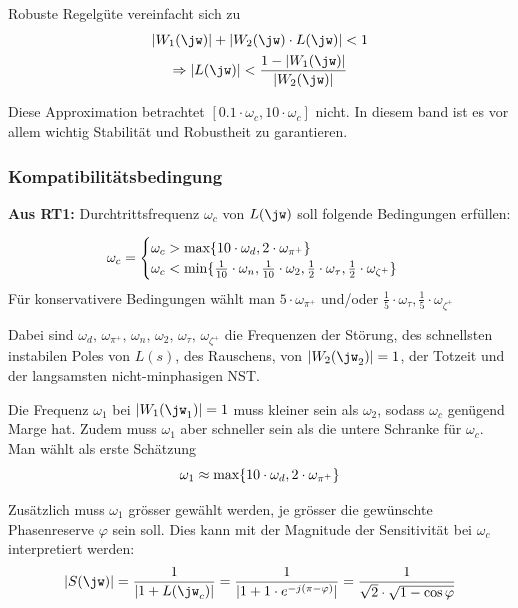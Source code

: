         Robuste Regelgüte vereinfacht sich zu
        \begin{gather*}
            |W_1(\jw)| + |W_2(\jw)\cdot L(\jw)| < 1\\
            \Rightarrow |L(\jw)| < \frac{1 - |W_1(\jw)|}{|W_2(\jw)|}
        \end{gather*}
        
        Diese Approximation betrachtet $[0.1\cdot \omega_c, 10\cdot\omega_c]$ nicht. In diesem band ist es vor allem wichtig Stabilität und Robustheit zu garantieren.
        
    \subsubsection{Kompatibilitätsbedingung}
        \textbf{Aus RT1:} Durchtrittsfrequenz $\omega_c$ von $L(\jw)$ soll folgende Bedingungen erfüllen:
        
        \begin{equation*}
            \omega_c = 
            \begin{cases}
                \omega_c > \textnormal{max}\{10\cdot\omega_d, 2\cdot\omega_{\pi^+}\}\\
                \omega_c < \textnormal{min}\{\frac{1}{10}\cdot\omega_n, \frac{1}{10}\cdot \omega_2, \frac{1}{2}\cdot \omega_\tau, \frac{1}{2}\cdot \omega_{\zeta^+}\}
            \end{cases}
        \end{equation*}
        Für konservativere Bedingungen wählt man $5\cdot\omega_{\pi^+}$ und/oder $\frac{1}{5}\cdot \omega_\tau, \frac{1}{5}\cdot \omega_{\zeta^+}$
        
        Dabei sind $\omega_d,\, \omega_{\pi^+},\, \omega_n,\, \omega_2,\, \omega_\tau,\, \omega_{\zeta^+}$ die Frequenzen der Störung, des schnellsten instabilen Poles von $L(s)$, des Rauschens, von $|W_2(\jw_2)|=1$, der Totzeit und der langsamsten nicht-minphasigen NST.
        
        Die Frequenz $\omega_1$ bei $|W_1(\jw_1)| = 1$ muss kleiner sein als $\omega_2$, sodass $\omega_c$ genügend Marge hat. Zudem muss $\omega_1$ aber schneller sein als die untere Schranke für $\omega_c$. Man wählt als erste Schätzung
        \begin{equation*}
            \omega_1 \approx \textnormal{max}\{10\cdot\omega_d, 2\cdot\omega_{\pi^+}\}
        \end{equation*}
        
        Zusätzlich muss $\omega_1$ grösser gewählt werden, je grösser die gewünschte Phasenreserve $\varphi$ sein soll. Dies kann mit der Magnitude der Sensitivität bei $\omega_c$ interpretiert werden:
        \begin{equation*}
            |S(\jw)| = \frac{1}{|1+L(\jw_c)|}= \frac{1}{|1+1\cdot e^{-j(\pi-\varphi)}|} = \frac{1}{\sqrt{2}\cdot\sqrt{1-\cos{\varphi}}}
        \end{equation*}
        

